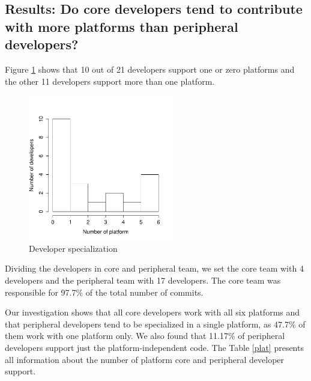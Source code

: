 \documentclass[10pt, conference]{IEEEtran}
\begin{document}
\subsection{Results: Do core developers tend to contribute with more platforms than peripheral developers?}

Figure \ref{DeveloperSpecialization} shows that 10 out of 21 developers support one or zero platforms and the other 11 developers support more than one platform.


\begin{figure}[h]
\centering
\includegraphics[width=2.5in]{DeveloperSpecialization}
\caption{Developer specialization}
\label{DeveloperSpecialization}
\end{figure}

Dividing the developers in core and peripheral team, we set the core team with 4 developers and the peripheral team with 17 developers. The core team was responsible for 97.7\% of the total number of commits. 


Our investigation shows that all core developers work with all six platforms and that peripheral developers tend to be specialized in a single platform, as 47.7\% of them work with one platform only. We also found that 11.17\% of peripheral developers support just the platform-independent code. The Table \ref{plat} presents all information about the number of platform core and peripheral developer support.    
\end{document}

